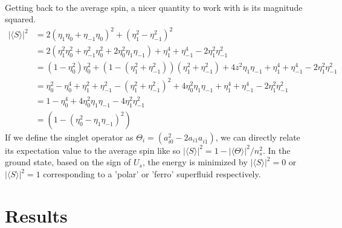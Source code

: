 \vspace{0.5cm}\\
Getting back to the average spin, a nicer quantity to work with is its magnitude squared.
\begin{align}
    |\langle S \rangle|^2 &= 2(\eta_1\eta_0 + \eta_{-1}\eta_0)^2 + (\eta_1^2 - \eta_{-1}^2)^2 \nonumber\\
    &= 2(\eta_1^2 \eta_0^2 + \eta_{-1}^2 \eta_0^2 + 2 \eta_0^2\eta_1\eta_{-1}) + \eta_1^4 + \eta_{-1}^4 - 2\eta_1^2 \eta_{-1}^2 \nonumber\\ 
    &= (1 - \eta_0^2)\eta_0^2 + (1 - (\eta_1^2 + \eta_{-1}^2))(\eta_1^2 + \eta_{-1}^2) + 4z^2\eta_1\eta_{-1} + \eta_1^4 + \eta_{-1}^4 - 2\eta_1^2 \eta_{-1}^2 \nonumber\\
    &= \eta_0^2 - \eta_0^4 + \eta_1^2 + \eta_{-1}^2 - (\eta_1^2 + \eta_{-1}^2)^2 + 4 \eta_0^2\eta_1\eta_{-1} + \eta_1^4 + \eta_{-1}^4 - 2\eta_1^2 \eta_{-1}^2 \nonumber\\
    &= 1 - \eta_0^4 + 4 \eta_0^2\eta_1\eta_{-1} - 4\eta_1^2\eta_{-1}^2 \nonumber\\
    &= (1 - (\eta_0^2 - \eta_1\eta_{-1})^2)
\end{align}
If we define the singlet operator as $\Theta_i = (a_{i0}^2 - 2a_{i1}a_{i\overline{1}})$, we can directly relate its expectation value to the average spin like so $|\langle S\rangle|^2 = 1 - |\langle \Theta \rangle|^2/n_s^2$. In the ground state, based on the sign of $U_s$, the energy is minimized by $|\langle S \rangle|^2 = 0$ or $|\langle S \rangle|^2 = 1$ corresponding to a 'polar' or 'ferro' superfluid respectively\cite{Tsuchiya_2004}.


\section{Results}
